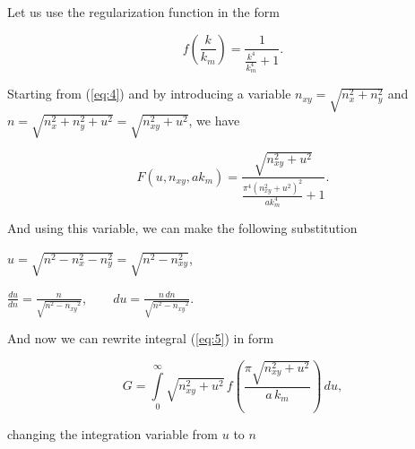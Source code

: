 \documentclass[twoside, 10pt, ptm]{article}
\begin{document}
\begin{multicols}{2}
    Let us use the regularization function in the form

\setcounter{equation}{0}
\renewcommand{\theequation}{A.\arabic{equation}}

\begin{equation}
f\left(\frac{k}{k_m}\right) = \frac{1}{\frac{k^{4}}{k_{m}^{4}} + 1}.
\end{equation}





    Starting from (\ref{eq:4}) and by introducing a variable \(n_{xy} = \sqrt{n_x^2 + n_y^2}\) and \(n = \sqrt{n_x^2 + n_y^2 + u^2} = \sqrt{n_{xy}^2 + u^2}\), we have 

\noindent
\begin{equation}
F\left(u, n_{xy}, ak_m\right) = \frac{\sqrt{n_{\mathit{xy}}^{2} + u^{2}}}{\frac{\pi^{4} {\left(n_{\mathit{xy}}^{2} + u^{2}\right)}^{2}}{\mathit{ak}_{m}^{4}} + 1}.
\end{equation}


And using this variable, we can make the following substitution

\(u = \sqrt{n^2 - n_x^2 - n_y^2} = \sqrt{n^2 - n_{xy}^2}\),

\(\frac{du}{dn} = \frac{n}{\sqrt{n^{2} - \mathit{n_{xy}}^{2}}}\), $\,\,\,\,\,\,\,\,\,$ \(d{u}= \frac{n\,d{n}}{\sqrt{n^{2} - \mathit{n_{xy}}^{2}}}\).

    And now we can rewrite integral (\ref{eq:5}) in form

\begin{equation}
G%
 = \int\limits_{0}^{\infty}\sqrt{n_{xy}^2+u^2}\,
f\left(\frac{\pi\sqrt{n_{xy}^2+u^2}}{a\,k_m}\right)\,d{u},
\end{equation}

changing the integration variable from \(u\) to \(n\)



\end{multicols}
\end{document}

